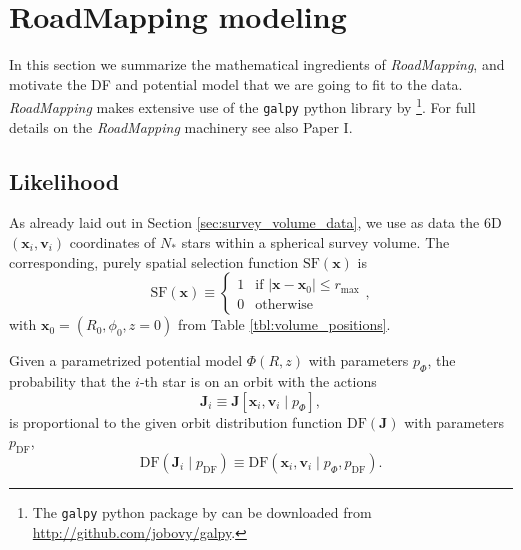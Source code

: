 \documentclass[iop,revtex4,numberedappendix,appendixfloats]{emulateapj}
\newcommand{\vect}[1]{\boldsymbol{#1}}
\newcommand{\RM}{{\sl RoadMapping}}
\begin{document}
\section{RoadMapping modeling} \label{sec:RoadMapping}

In this section we summarize the mathematical ingredients of \RM{}, and motivate the DF and potential model that we are going to fit to the data. \RM{} makes extensive use of the \texttt{galpy} python library by \citet{2015ApJS..216...29B}\footnote{The \texttt{galpy} python package by \citet{2015ApJS..216...29B} can be downloaded from \url{http://github.com/jobovy/galpy}.}. For full details on the \RM{} machinery see also Paper I.

\subsection{Likelihood} \label{sec:likelihood}

As already laid out in Section \ref{sec:survey_volume_data}, we use as data the 6D $(\vect{x}_i,\vect{v}_i)$ coordinates of $N_*$ stars within a spherical survey volume. The corresponding, purely spatial selection function $\text{SF}(\vect{x})$ is
\begin{equation}
\text{SF}(\vect{x}) \equiv \begin{cases} 1 &\mbox{if } \left| \vect{x}-\vect{x}_0 \right| \leq r_\text{max} \\
0 & \mbox{otherwise} \end{cases},
\end{equation}
with $\vect{x}_0 = (R_0,\phi_0,z=0)$ from Table \ref{tbl:volume_positions}.

Given a parametrized potential model $\Phi(R,z)$ with parameters $p_\Phi$, the probability that the $i$-th star is on an orbit with the actions 
\begin{equation}
\vect{J}_i \equiv \vect{J}[\vect{x}_i,\vect{v}_i \mid p_\Phi],
\end{equation}
is proportional to the given orbit distribution function $\text{DF}(\vect{J})$ with parameters $p_\text{DF}$,
\begin{equation}
\text{DF}(\vect{J}_i \mid p_\text{DF}) \equiv \text{DF}(\vect{x}_i,\vect{v}_i \mid p_\Phi,p_\text{DF}).
\end{equation}
\end{document}
